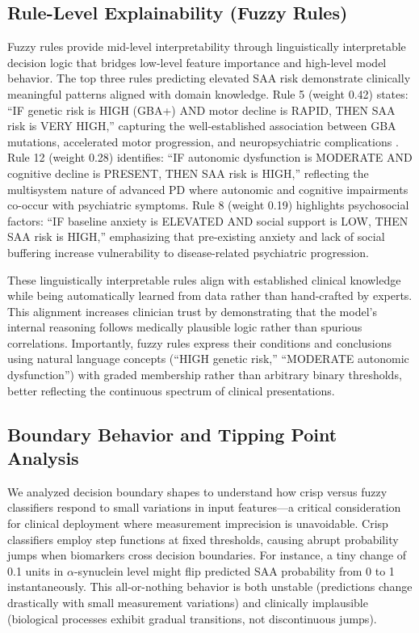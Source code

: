 \documentclass[journal,twoside,web]{ieeecolor}
\begin{document}
\subsection{Rule-Level Explainability (Fuzzy Rules)}

Fuzzy rules provide mid-level interpretability through linguistically interpretable decision logic that bridges low-level feature importance and high-level model behavior. The top three rules predicting elevated SAA risk demonstrate clinically meaningful patterns aligned with domain knowledge. Rule 5 (weight 0.42) states: ``IF genetic risk is HIGH (GBA+) AND motor decline is RAPID, THEN SAA risk is VERY HIGH,'' capturing the well-established association between GBA mutations, accelerated motor progression, and neuropsychiatric complications \cite{nalls2019identification}. Rule 12 (weight 0.28) identifies: ``IF autonomic dysfunction is MODERATE AND cognitive decline is PRESENT, THEN SAA risk is HIGH,'' reflecting the multisystem nature of advanced PD where autonomic and cognitive impairments co-occur with psychiatric symptoms. Rule 8 (weight 0.19) highlights psychosocial factors: ``IF baseline anxiety is ELEVATED AND social support is LOW, THEN SAA risk is HIGH,'' emphasizing that pre-existing anxiety and lack of social buffering increase vulnerability to disease-related psychiatric progression.

These linguistically interpretable rules align with established clinical knowledge while being automatically learned from data rather than hand-crafted by experts. This alignment increases clinician trust \cite{torres2006fuzzy} by demonstrating that the model's internal reasoning follows medically plausible logic rather than spurious correlations. Importantly, fuzzy rules express their conditions and conclusions using natural language concepts (``HIGH genetic risk,'' ``MODERATE autonomic dysfunction'') with graded membership rather than arbitrary binary thresholds, better reflecting the continuous spectrum of clinical presentations.

\subsection{Boundary Behavior and Tipping Point Analysis}

We analyzed decision boundary shapes to understand how crisp versus fuzzy classifiers respond to small variations in input features---a critical consideration for clinical deployment where measurement imprecision is unavoidable. Crisp classifiers employ step functions at fixed thresholds, causing abrupt probability jumps when biomarkers cross decision boundaries. For instance, a tiny change of 0.1 units in $\alpha$-synuclein level might flip predicted SAA probability from 0 to 1 instantaneously. This all-or-nothing behavior is both unstable (predictions change drastically with small measurement variations) and clinically implausible (biological processes exhibit gradual transitions, not discontinuous jumps).
\end{document}
